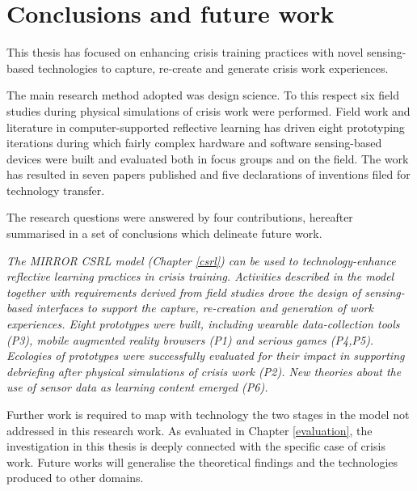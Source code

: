 \chapter{Conclusions and future work}\label{conclusions}


This thesis has focused on enhancing crisis training practices with novel sensing-based technologies to capture, re-create and generate crisis work experiences.

The main research method adopted was design science. To this respect six field studies during physical simulations of crisis work were performed. Field work and literature in computer-supported reflective learning has driven eight prototyping iterations during which fairly complex hardware and software sensing-based devices were built and evaluated both in focus groups and on the field. The work has resulted in seven papers published and five declarations of inventions filed for technology transfer.

The research questions were answered by four contributions, hereafter summarised in a set of conclusions which delineate future work. 
	
\begin{framed}
\emph{The MIRROR CSRL model (Chapter \ref{csrl}) can be used to technology-enhance reflective learning practices in crisis training. Activities described in the model together with requirements derived from field studies drove the design of sensing-based interfaces to support the capture, re-creation and generation of work experiences. Eight prototypes were built, including wearable data-collection tools (P3), mobile augmented reality browsers (P1) and serious games (P4,P5). Ecologies of prototypes were successfully evaluated for their impact in supporting debriefing after physical simulations of crisis work (P2). New theories about the use of sensor data as learning content emerged (P6).}
\par
Further work is required to map with technology the two stages in the model not addressed in this research work. As evaluated in Chapter \ref{evaluation}, the investigation in this thesis is deeply connected with the specific case of crisis work. Future works will generalise the theoretical findings and the technologies produced to other domains. 
\end{framed}

